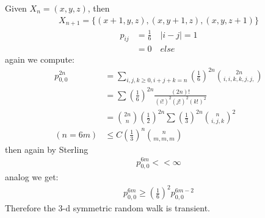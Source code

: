 \begin{example}
\end{example}

\begin{example}
Given $X_n = (x, y, z)$, then
\begin{align*}
	X_{n+1} = \{(x+1, y, z), (x, y+1, z), (x, y, z+1)\}
\end{align*}	
\begin{align*}
	p_{ij} &= \frac{1}{6} \quad |i - j| = 1\\
	&= 0 \quad else
\end{align*}
again we compute:
\begin{align*}
	p^{2n}_{0,0} &= \sum_{ i, j, k \geq 0, i+j+k = n} (\frac{1}{6})^{2n} \binom{2n}{i, i, k, k , j, j, } \\
	&= \sum (\frac{1}{6})^{2n} \frac{(2n)!}{(i!)^2 (j!)^2 (k!)^2} \\
	&= \binom{2n}{n}(\frac{1}{2})^{2n} \sum (\frac{1}{3})^{2n} \binom{n}{i, j, k}^2\\
	( n = 6m)&\le C (\frac{1}{3})^n \binom{n}{m, m, m}
\end{align*}
then again by Sterling 
\begin{align*}
	p_{0, 0}^{6m} < < \infty
\end{align*}
analog we get:
\begin{align*}
	p^{6m}_{0, 0} \geq (\frac{1}{6})^2 p^{6m - 2}_{0,0}
\end{align*}
Therefore the 3-d symmetric random walk is transient.
\end{example}

